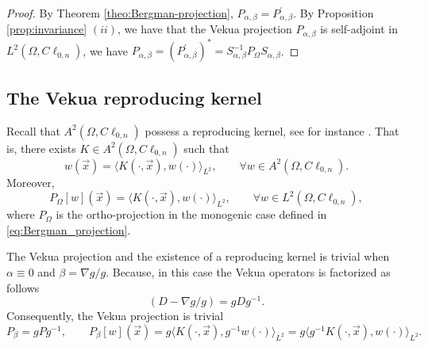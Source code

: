 \documentclass[12pt]{article}
\newcommand{\comment}[1]{\marginpar{\hfuzz=5ex
\scriptsize$\stackrel{?}{\longleftarrow}$\\\hspace*{-3ex}
{\fbox{\parbox{20ex}{\hfuzz=15ex \raggedright\sf#1 }}} }}
\begin{document}
\begin{proof}
By Theorem \ref{theo:Bergman-projection}, $P_{\alpha,\beta}=P_{\alpha,\beta}^{\prime}$. By Proposition \ref{prop:invariance} $(ii)$, we have that the Vekua projection $P_{\alpha,\beta}$ is self-adjoint in $L^2(\Omega,C\ell_{0,n})$, we have $P_{\alpha,\beta}=(P_{\alpha,\beta}^{\prime})^*=S_{\alpha,\beta}^{-1} P_{\Omega} S_{\alpha,\beta}$.
\end{proof}


\subsection{The Vekua reproducing kernel}\label{sec:kernel}
Recall that $A^2(\Omega,C\ell_{0,n})$ possess a reproducing kernel, see for instance \cite{Legatiuk2018}. That is, there exists $K\in A^2(\Omega,C\ell_{0,n})$ such that
\[
w(\vec x)=\langle  K(\cdot, \vec x), w(\cdot)\rangle_{L^2},\qquad \forall  w\in A^2(\Omega,C\ell_{0,n}).
\]
Moreover,
\begin{equation}\label{eq:kernel-1}
   P_{\Omega}[w](\vec x)=\langle  K(\cdot, \vec x), w(\cdot)\rangle_{L^2},\qquad \forall  w\in L^2(\Omega,C\ell_{0,n}),
\end{equation}
where $P_{\Omega}$ is the ortho-projection in the monogenic case defined in \eqref{eq:Bergman_projection}.

The Vekua projection and the existence of a reproducing kernel is trivial when $\alpha\equiv 0$ and $\beta=\nabla g/g$. Because, in this case the Vekua operators is factorized as follows \cite{Sprossig1993}
\[
  (D-\nabla g/g)=gDg^{-1}.
\]
Consequently, the Vekua projection is trivial
\begin{equation*}
   P_{\beta}=gPg^{-1}, \qquad    P_{\beta}[w](\vec x)=g \langle  K(\cdot, \vec x), g^{-1}w(\cdot)\rangle_{L^2}
   =g  \langle  g^{-1}K(\cdot, \vec x), w(\cdot)\rangle_{L^2}.
\end{equation*}
\end{document}
